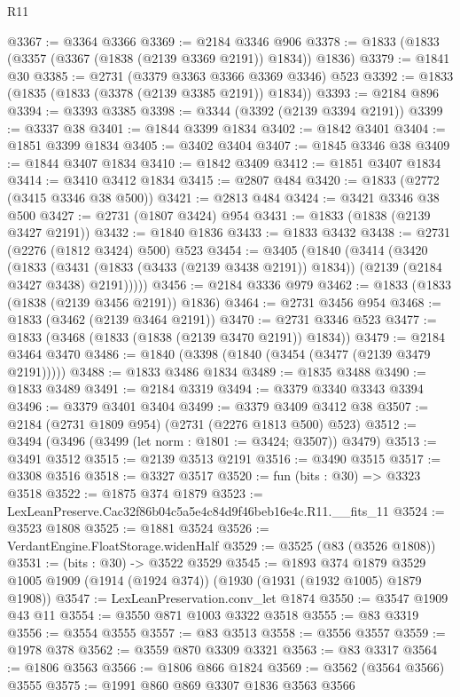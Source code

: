 \begin{lexlean}{R11}
\begin{coremodule}
@3367 := @3364 @3366
@3369 := @2184 @3346 @906
@3378 := @1833 (@1833 (@3357 (@3367 (@1838 (@2139 @3369 @2191)) @1834)) @1836)
@3379 := @1841 @30
@3385 := @2731 (@3379 @3363 @3366 @3369 @3346) @523
@3392 := @1833 (@1835 (@1833 (@3378 (@2139 @3385 @2191)) @1834))
@3393 := @2184 @896
@3394 := @3393 @3385
@3398 := @3344 (@3392 (@2139 @3394 @2191))
@3399 := @3337 @38
@3401 := @1844 @3399 @1834
@3402 := @1842 @3401
@3404 := @1851 @3399 @1834
@3405 := @3402 @3404
@3407 := @1845 @3346 @38
@3409 := @1844 @3407 @1834
@3410 := @1842 @3409
@3412 := @1851 @3407 @1834
@3414 := @3410 @3412 @1834
@3415 := @2807 @484
@3420 := @1833 (@2772 (@3415 @3346 @38 @500))
@3421 := @2813 @484
@3424 := @3421 @3346 @38 @500
@3427 := @2731 (@1807 @3424) @954
@3431 := @1833 (@1838 (@2139 @3427 @2191))
@3432 := @1840 @1836
@3433 := @1833 @3432
@3438 := @2731 (@2276 (@1812 @3424) @500) @523
@3454 := @3405
    (@1840
      (@3414
        (@3420
          (@1833
            (@3431 (@1833 (@3433 (@2139 @3438 @2191)) @1834))
            (@2139 (@2184 @3427 @3438) @2191)))))
@3456 := @2184 @3336 @979
@3462 := @1833 (@1833 (@1838 (@2139 @3456 @2191)) @1836)
@3464 := @2731 @3456 @954
@3468 := @1833 (@3462 (@2139 @3464 @2191))
@3470 := @2731 @3346 @523
@3477 := @1833 (@3468 (@1833 (@1838 (@2139 @3470 @2191)) @1834))
@3479 := @2184 @3464 @3470
@3486 := @1840 (@3398 (@1840 (@3454 (@3477 (@2139 @3479 @2191)))))
@3488 := @1833 @3486 @1834
@3489 := @1835 @3488
@3490 := @1833 @3489
@3491 := @2184 @3319
@3494 := @3379 @3340 @3343 @3394
@3496 := @3379 @3401 @3404
@3499 := @3379 @3409 @3412 @38
@3507 := @2184 (@2731 @1809 @954) (@2731 (@2276 @1813 @500) @523)
@3512 := @3494 (@3496 (@3499 (let norm : @1801 := @3424; @3507)) @3479)
@3513 := @3491 @3512
@3515 := @2139 @3513 @2191
@3516 := @3490 @3515
@3517 := @3308 @3516
@3518 := @3327 @3517
@3520 := fun (bits : @30) => @3323 @3518
@3522 := @1875 @374 @1879
@3523 := LexLeanPreserve.Cac32f86b04c5a5e4c84d9f46beb16e4c.R11.__fits_11
@3524 := @3523 @1808
@3525 := @1881 @3524
@3526 := VerdantEngine.FloatStorage.widenHalf
@3529 := @3525 (@83 (@3526 @1808))
@3531 := (bits : @30) -> @3522 @3529
@3545 := @1893
    @374
    @1879
    @3529
    @1005
    @1909
    (@1914 (@1924 @374))
    (@1930 (@1931 (@1932 @1005) @1879 @1908))
@3547 := LexLeanPreservation.conv_let @1874
@3550 := @3547 @1909 @43 @11
@3554 := @3550 @871 @1003 @3322 @3518
@3555 := @83 @3319
@3556 := @3554 @3555
@3557 := @83 @3513
@3558 := @3556 @3557
@3559 := @1978 @378
@3562 := @3559 @870 @3309 @3321
@3563 := @83 @3317
@3564 := @1806 @3563
@3566 := @1806 @866 @1824
@3569 := @3562 (@3564 @3566) @3555
@3575 := @1991 @860 @869 @3307 @1836 @3563 @3566

\end{coremodule}
\end{lexlean}
